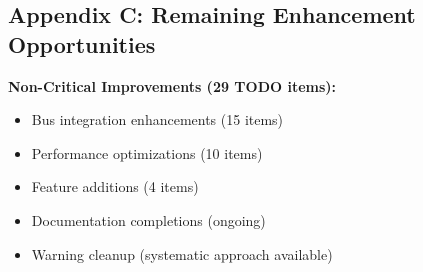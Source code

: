 \documentclass[11pt,a4paper]{article}
\begin{document}
\subsection{Appendix C: Remaining Enhancement Opportunities}

\textbf{Non-Critical Improvements (29 TODO items):}
\begin{itemize}
    \item Bus integration enhancements (15 items)
    \item Performance optimizations (10 items)
    \item Feature additions (4 items)
    \item Documentation completions (ongoing)
    \item Warning cleanup (systematic approach available)
\end{itemize}
\end{document}
